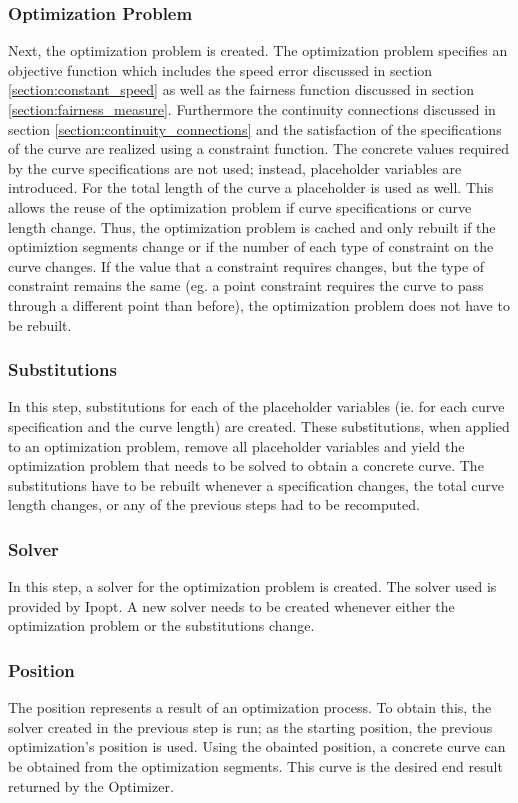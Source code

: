 \documentclass[a4paper]{article}
\begin{document}
				\subsubsection{Optimization Problem}
					Next, the optimization problem is created. The optimization problem specifies an objective function which includes the speed error discussed in section \ref{section:constant_speed} as well as the fairness function discussed in section \ref{section:fairness_measure}. Furthermore the continuity connections discussed in section \ref{section:continuity_connections} and the satisfaction of the specifications of the curve are realized using a constraint function. The concrete values required by the curve specifications are not used; instead, placeholder variables are introduced. For the total length of the curve a placeholder is used as well. This allows the reuse of the optimization problem if curve specifications or curve length change. Thus, the optimization problem is cached and only rebuilt if the optimiztion segments change or if the number of each type of constraint on the curve changes. If the value that a constraint requires changes, but the type of constraint remains the same (eg. a point constraint requires the curve to pass through a different point than before), the optimization problem does not have to be rebuilt.
					
				\subsubsection{Substitutions}
					In this step, substitutions for each of the placeholder variables (ie. for each curve specification and the curve length) are created. These substitutions, when applied to an optimization problem, remove all placeholder variables and yield the optimization problem that needs to be solved to obtain a concrete curve. The substitutions have to be rebuilt whenever a specification changes, the total curve length changes, or any of the previous steps had to be recomputed.
					
				\subsubsection{Solver}
					In this step, a solver for the optimization problem is created. The solver used is provided by Ipopt. A new solver needs to be created whenever either the optimization problem or the substitutions change.
				
				\subsubsection{Position}
					The position represents a result of an optimization process. To obtain this, the solver created in the previous step is run; as the starting position, the previous optimization's position is used. Using the obainted position, a concrete curve can be obtained from the optimization segments. This curve is the desired end result returned by the Optimizer. 
				
\end{document}
